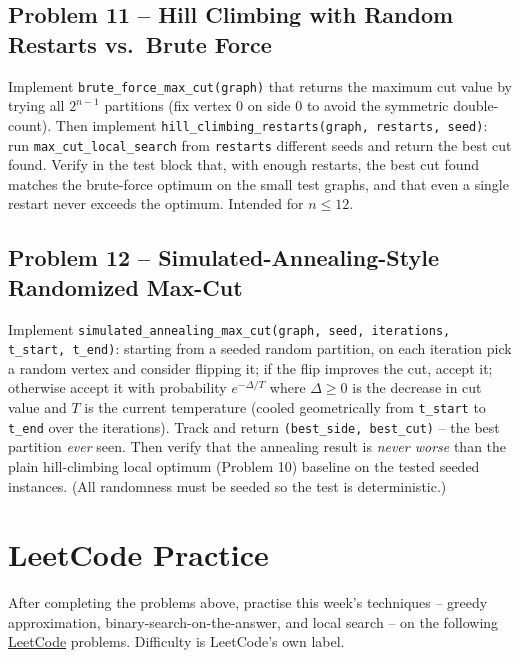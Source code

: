 \documentclass[11pt]{article}
\begin{document}
\subsection*{Problem 11 -- Hill Climbing with Random Restarts vs.\ Brute Force}

Implement \texttt{brute\_force\_max\_cut(graph)} that returns the maximum cut value by
trying all $2^{n-1}$ partitions (fix vertex $0$ on side $0$ to avoid the symmetric
double-count). Then implement \texttt{hill\_climbing\_restarts(graph, restarts, seed)}:
run \texttt{max\_cut\_local\_search} from \texttt{restarts} different seeds and return the
best cut found. Verify in the test block that, with enough restarts, the best cut found
matches the brute-force optimum on the small test graphs, and that even a single restart
never exceeds the optimum. Intended for $n \le 12$.

\subsection*{Problem 12 -- Simulated-Annealing-Style Randomized Max-Cut}

Implement \texttt{simulated\_annealing\_max\_cut(graph, seed, iterations, t\_start,
t\_end)}: starting from a seeded random partition, on each iteration pick a random vertex
and consider flipping it; if the flip improves the cut, accept it; otherwise accept it with
probability $e^{-\Delta/T}$ where $\Delta \ge 0$ is the decrease in cut value and $T$ is
the current temperature (cooled geometrically from \texttt{t\_start} to \texttt{t\_end}
over the iterations). Track and return \texttt{(best\_side, best\_cut)} -- the best
partition \emph{ever} seen. Then verify that the annealing result is \emph{never worse}
than the plain hill-climbing local optimum (Problem 10) baseline on the tested seeded
instances. (All randomness must be seeded so the test is deterministic.)

\newpage
\section{LeetCode Practice}

After completing the problems above, practise this week's techniques -- greedy
approximation, binary-search-on-the-answer, and local search -- on the following
\href{https://leetcode.com}{LeetCode} problems. Difficulty is LeetCode's own label.
\end{document}

